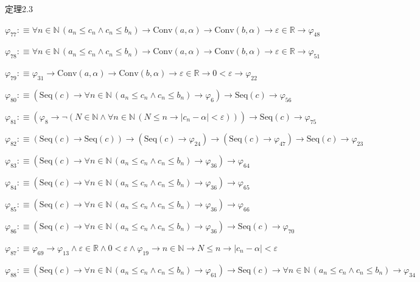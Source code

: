 \begin{fullproof}{定理2.3}
\begin{abbrevlist}
\item $\varphi_{77} :\equiv \forall n \in \mathbb{N}\,(a_{n} \leq c_{n} \land c_{n} \leq b_{n}) \to \mathrm{Conv}(a,\alpha) \to \mathrm{Conv}(b,\alpha) \to \varepsilon \in \mathbb{R} \to \varphi_{48}$
\item $\varphi_{78} :\equiv \forall n \in \mathbb{N}\,(a_{n} \leq c_{n} \land c_{n} \leq b_{n}) \to \mathrm{Conv}(a,\alpha) \to \mathrm{Conv}(b,\alpha) \to \varepsilon \in \mathbb{R} \to \varphi_{51}$
\item $\varphi_{79} :\equiv \varphi_{31} \to \mathrm{Conv}(a,\alpha) \to \mathrm{Conv}(b,\alpha) \to \varepsilon \in \mathbb{R} \to 0 < \varepsilon \to \varphi_{22}$
\item $\varphi_{80} :\equiv (\mathrm{Seq}(c) \to \forall n \in \mathbb{N}\,(a_{n} \leq c_{n} \land c_{n} \leq b_{n}) \to \varphi_{6}) \to \mathrm{Seq}(c) \to \varphi_{56}$
\item $\varphi_{81} :\equiv (\varphi_{8} \to \neg (N \in \mathbb{N} \land \forall n \in \mathbb{N}\,(N \leq n \to \lvert c_{n} - \alpha \rvert < \varepsilon))) \to \mathrm{Seq}(c) \to \varphi_{75}$
\item $\varphi_{82} :\equiv (\mathrm{Seq}(c) \to \mathrm{Seq}(c)) \to (\mathrm{Seq}(c) \to \varphi_{24}) \to (\mathrm{Seq}(c) \to \varphi_{47}) \to \mathrm{Seq}(c) \to \varphi_{23}$
\item $\varphi_{83} :\equiv (\mathrm{Seq}(c) \to \forall n \in \mathbb{N}\,(a_{n} \leq c_{n} \land c_{n} \leq b_{n}) \to \varphi_{36}) \to \varphi_{64}$
\item $\varphi_{84} :\equiv (\mathrm{Seq}(c) \to \forall n \in \mathbb{N}\,(a_{n} \leq c_{n} \land c_{n} \leq b_{n}) \to \varphi_{36}) \to \varphi_{65}$
\item $\varphi_{85} :\equiv (\mathrm{Seq}(c) \to \forall n \in \mathbb{N}\,(a_{n} \leq c_{n} \land c_{n} \leq b_{n}) \to \varphi_{36}) \to \varphi_{66}$
\item $\varphi_{86} :\equiv (\mathrm{Seq}(c) \to \forall n \in \mathbb{N}\,(a_{n} \leq c_{n} \land c_{n} \leq b_{n}) \to \varphi_{36}) \to \mathrm{Seq}(c) \to \varphi_{70}$
\item $\varphi_{87} :\equiv \varphi_{69} \to \varphi_{13} \land \varepsilon \in \mathbb{R} \land 0 < \varepsilon \land \varphi_{19} \to n \in \mathbb{N} \to N \leq n \to \lvert c_{n} - \alpha \rvert < \varepsilon$
\item $\varphi_{88} :\equiv (\mathrm{Seq}(c) \to \forall n \in \mathbb{N}\,(a_{n} \leq c_{n} \land c_{n} \leq b_{n}) \to \varphi_{61}) \to \mathrm{Seq}(c) \to \forall n \in \mathbb{N}\,(a_{n} \leq c_{n} \land c_{n} \leq b_{n}) \to \varphi_{34}$

\end{abbrevlist}
\end{fullproof}
